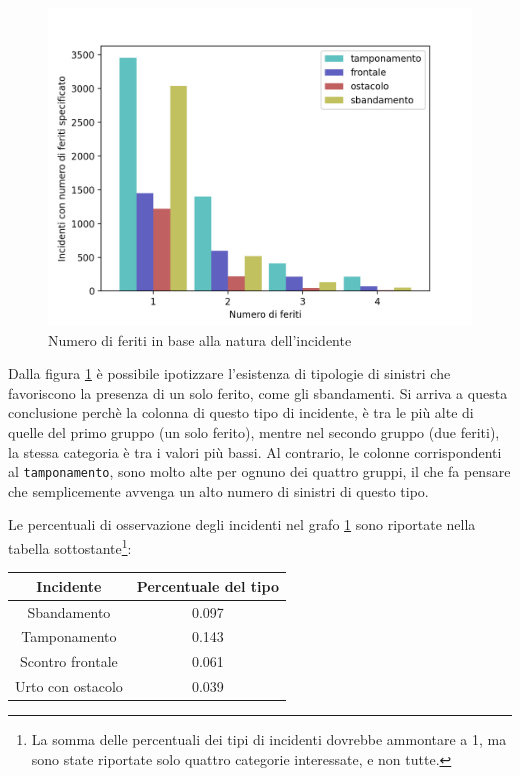 \documentclass[a4paper,12pt]{report}
\newcommand{\columnstyle}[1]{\texttt{#1}}
\begin{document}
\begin{figure}
    \includegraphics[width=\linewidth]{../src/incidenti/incidenti_senza_coords/natura_incidente/natura_incidente.png}
    \caption{Numero di feriti in base alla natura dell'incidente}
    \label{fig:numero-feriti}
\end{figure}

Dalla figura \ref{fig:numero-feriti} è possibile ipotizzare l'esistenza di tipologie 
di sinistri che favoriscono la presenza di un solo ferito, come gli sbandamenti. 
Si arriva a questa conclusione perchè la colonna di questo tipo di incidente, è tra 
le più alte di quelle del primo gruppo (un solo ferito), 
mentre nel secondo gruppo (due feriti), la stessa categoria è tra i valori 
più bassi.
Al contrario, le colonne corrispondenti al \columnstyle{tamponamento}, sono molto alte 
per ognuno dei quattro gruppi, il che fa pensare che semplicemente avvenga un alto numero 
di sinistri di questo tipo.

Le percentuali di osservazione degli incidenti nel grafo \ref{fig:numero-feriti} sono 
riportate nella tabella sottostante\footnote{La somma delle percentuali dei tipi di 
incidenti dovrebbe ammontare a 1, ma sono state riportate solo quattro categorie 
interessate, e non tutte.}: 

\begin{center}
    \def\arraystretch{1.5}%
    \begin{tabular}{ |c|c| } 
    \hline
    Incidente & Percentuale del tipo \\ 
    \hline
    \rowcolor{TableGray}
    Sbandamento       & 0.097 \\
    Tamponamento      & 0.143 \\
    \rowcolor{TableGray}
    Scontro frontale  & 0.061 \\
    Urto con ostacolo & 0.039 \\
    \hline
    \end{tabular}
\end{center}
\end{document}

